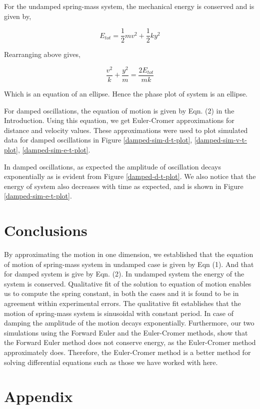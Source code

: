 \documentclass[letterpaper,12pt]{article}
\begin{document}
For the undamped spring-mass system, the mechanical energy is conserved and is given by,

$$E_{tot} = \frac{1}{2}mv^2 + \frac{1}{2}ky^2$$

Rearranging above gives,

$$\frac{v^2}{k} + \frac{y^2}{m} = \frac{2E_{tot}}{mk}$$

Which is an equation of an ellipse. Hence the phase plot of system is an ellipse.

For damped oscillations, the equation of motion is given by Eqn. (2) in the Introduction. Using this equation, we get
Euler-Cromer approximations for distance and velocity values. These approximations were used to 
plot simulated data for damped oscillations in Figure \ref{damped-sim-d-t-plot}, \ref{damped-sim-v-t-plot}, \ref{damped-sim-e-t-plot}.

In damped oscillations, as expected the amplitude of oscillation decays exponentially as is evident
from Figure \ref{damped-d-t-plot}. We also notice that the energy of system also decreases with time as expected, and is shown in Figure \ref{damped-sim-e-t-plot}.

\section{Conclusions}

By approximating the motion in one dimension, we established that the equation of motion of spring-mass 
system in undamped case is given by Eqn (1). And that for damped system is give by Eqn. (2). In undamped 
system the energy of the system is conserved. Qualitative fit of the solution to equation of motion 
enables us to compute the spring constant, in both the cases and it is found to be in agreement within experimental errors.
The qualitative fit establishes that the motion of spring-mass system is sinusoidal with constant period. In 
case of damping the amplitude of the motion decays exponentially. Furthermore, our two simulations using the Forward Euler and the Euler-Cromer methods, show that the Forward Euler method does not conserve energy, as the Euler-Cromer method approximately does. Therefore, the Euler-Cromer method is a better method for solving differential equations such as those we have worked with here.

\pagebreak

\appendix

\section{Appendix}
\end{document}
